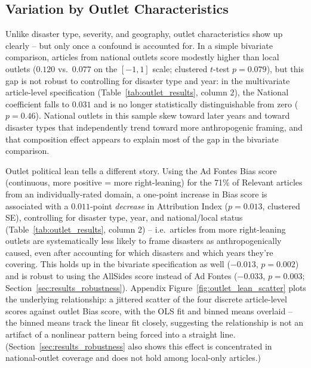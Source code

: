 \documentclass[12pt]{article}
\begin{document}
\subsection{Variation by Outlet Characteristics}
\label{sec:outlet_results}

Unlike disaster type, severity, and geography, outlet characteristics show
up clearly -- but only once a confound is accounted for. In a simple
bivariate comparison, articles from national outlets score modestly higher
than local outlets ($0.120$ vs.\ $0.077$ on the $[-1,1]$ scale; clustered
$t$-test $p=0.079$), but this gap is not robust to controlling for
disaster type and year: in the multivariate article-level specification
(Table~\ref{tab:outlet_results}, column 2), the National coefficient falls
to $0.031$ and is no longer statistically distinguishable from zero
($p=0.46$). National outlets in this sample skew toward later years and
toward disaster types that independently trend toward more anthropogenic
framing, and that composition effect appears to explain most of the gap in
the bivariate comparison.

Outlet political lean tells a different story. Using the Ad Fontes Bias
score (continuous, more positive = more right-leaning) for the 71\% of
Relevant articles from an individually-rated domain, a one-point increase
in Bias score is associated with a $0.011$-point \emph{decrease} in
Attribution Index ($p=0.013$, clustered SE), controlling for disaster type,
year, and national/local status (Table~\ref{tab:outlet_results}, column
2) -- i.e.\ articles from more right-leaning outlets are systematically
less likely to frame disasters as anthropogenically caused, even after
accounting for which disasters and which years they're covering. This
holds up in the bivariate specification as well ($-0.013$, $p=0.002$) and
is robust to using the AllSides score instead of Ad Fontes
($-0.033$, $p=0.003$; Section~\ref{sec:results_robustness}). Appendix
Figure~\ref{fig:outlet_lean_scatter} plots the underlying relationship: a
jittered scatter of the four discrete article-level scores against outlet
Bias score, with the OLS fit and binned means overlaid -- the binned means
track the linear fit closely, suggesting the relationship is not an
artifact of a nonlinear pattern being forced into a straight line.
(Section~\ref{sec:results_robustness} also shows this effect is
concentrated in national-outlet coverage and does not hold among
local-only articles.)
\end{document}
